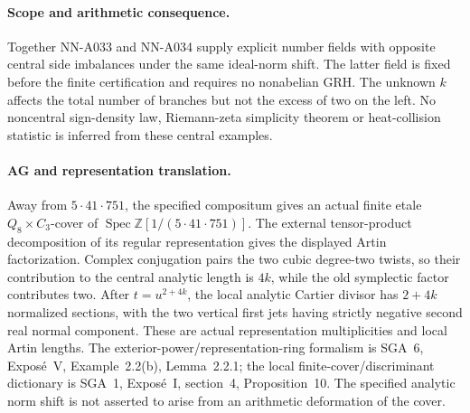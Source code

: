 \paragraph{Scope and arithmetic consequence.}
Together NN-A033 and NN-A034 supply explicit number fields
with opposite central side imbalances under the same
ideal-norm shift. The latter field is fixed before the
finite certification and requires no nonabelian GRH. The
unknown $k$ affects the total number of branches but not the
excess of two on the left. No noncentral sign-density law,
Riemann-zeta simplicity theorem or heat-collision statistic
is inferred from these central examples.

\paragraph{AG and representation translation.}
Away from $5\cdot41\cdot751$, the specified compositum gives
an actual finite etale $Q_8\times C_3$-cover of
$\operatorname{Spec}\mathbb Z[1/(5\cdot41\cdot751)]$.
The external tensor-product decomposition of its regular
representation gives the displayed Artin factorization.
Complex conjugation pairs the two cubic degree-two twists,
so their contribution to the central analytic length is
$4k$, while the old symplectic factor contributes two.
After $t=u^{2+4k}$, the local analytic Cartier divisor has
$2+4k$ normalized sections, with the two vertical first jets
having strictly negative second real normal component.
These are actual representation multiplicities and local
Artin lengths. The exterior-power/representation-ring
formalism is SGA~6, Expos\'e~V, Example~2.2(b),
Lemma~2.2.1; the local finite-cover/discriminant dictionary
is SGA~1, Expos\'e~I, section~4, Proposition~10. The
specified analytic norm shift is not asserted to arise
from an arithmetic deformation of the cover.
